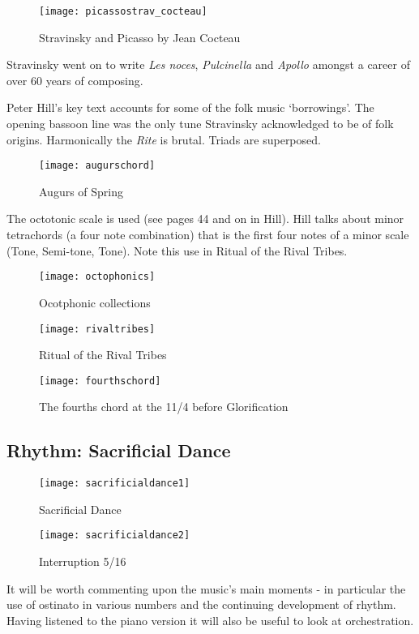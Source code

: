 \begin{figure}[H]
\centering
\texttt{[image: picassostrav\_cocteau]}\caption{Stravinsky and Picasso by Jean Cocteau}
\label{fig:stravpicasso_cocteau}
\end{figure}

Stravinsky went on to write \textit{Les noces}, \textit{Pulcinella} and \textit{Apollo} amongst a career of over 60 years of composing.  

Peter Hill's key text accounts for some of the folk music `borrowings'. The opening bassoon line was the only tune Stravinsky acknowledged to be of folk origins. Harmonically the \textit{Rite} is brutal. Triads are superposed. 

\begin{figure}[H]
\centering
\texttt{[image: augurschord]}\caption{Augurs of Spring}
\label{fig:augurschord}
\end{figure}

The octotonic scale is used (see pages 44 and on in Hill). Hill talks about minor tetrachords (a four note combination) that is the first four notes of a minor scale (Tone, Semi-tone, Tone). Note this use in Ritual of the Rival Tribes.

\begin{figure}[H]
\centering
\texttt{[image: octophonics]}\caption{Ocotphonic collections}
\label{fig:octophonics}
\end{figure}

\begin{figure}[H]
\centering
\texttt{[image: rivaltribes]}\caption{Ritual of the Rival Tribes}
\label{fig:rivaltribes}
\end{figure}

\begin{figure}[H]
\centering
\texttt{[image: fourthschord]}\caption{The fourths chord at the 11/4 before Glorification}
\label{fig:fourthschord}
\end{figure}

\subsection{Rhythm: Sacrificial Dance}

\begin{figure}[H]
\centering
\texttt{[image: sacrificialdance1]}\caption{Sacrificial Dance}
\label{fig:sacrificialdance1}
\end{figure}

\begin{figure}[H]
\centering
\texttt{[image: sacrificialdance2]}\caption{Interruption 5/16}
\label{fig:sacrificialdance2}
\end{figure}

It will be worth commenting upon the music's main moments - in particular the use of ostinato in various numbers and the continuing development of rhythm. Having listened to the piano version it will also be useful to look at orchestration. 




